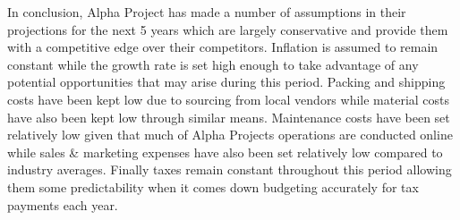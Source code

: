  

In conclusion, Alpha Project has made a number of assumptions in their projections for the next 5 years which are largely conservative and provide them with a competitive edge over their competitors. Inflation is assumed to remain constant while the growth rate is set high enough to take advantage of any potential opportunities that may arise during this period. Packing and shipping costs have been kept low due to sourcing from local vendors while material costs have also been kept low through similar means. Maintenance costs have been set relatively low given that much of Alpha Projects operations are conducted online while sales & marketing expenses have also been set relatively low compared to industry averages. Finally taxes remain constant throughout this period allowing them some predictability when it comes down budgeting accurately for tax payments each year.
